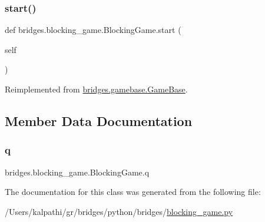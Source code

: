 \mbox{\label{classbridges_1_1blocking__game_1_1_blocking_game_ab7a2a5d6d83b2e72800ddffa3c0ad818}} 
\subsubsection{\texorpdfstring{start()}{start()}}
{\footnotesize\ttfamily def bridges.\+blocking\+\_\+game.\+Blocking\+Game.\+start (\begin{DoxyParamCaption}\item[{}]{self }\end{DoxyParamCaption})}



Reimplemented from \mbox{\hyperlink{classbridges_1_1gamebase_1_1_game_base_a05a30fccf88c2baba1137b5a06ba2ed7}{bridges.\+gamebase.\+Game\+Base}}.



\subsection{Member Data Documentation}
\mbox{\label{classbridges_1_1blocking__game_1_1_blocking_game_a21d2b164100c6cd61a36f8704c69e51f}} 
\subsubsection{\texorpdfstring{q}{q}}
{\footnotesize\ttfamily bridges.\+blocking\+\_\+game.\+Blocking\+Game.\+q}



The documentation for this class was generated from the following file\+:\begin{DoxyCompactItemize}
\item 
/\+Users/kalpathi/gr/bridges/python/bridges/\mbox{\hyperlink{blocking__game_8py}{blocking\+\_\+game.\+py}}\end{DoxyCompactItemize}
